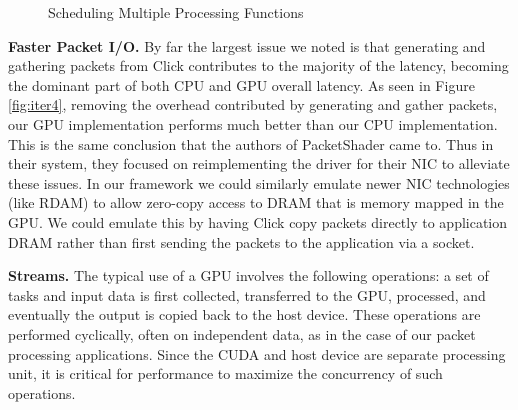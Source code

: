 \begin{figure}
    \centering

	\medskip

    \caption{Scheduling Multiple Processing Functions}
	\label{fig:scheduling}
\end{figure}

\medskip \noindent \textbf{Faster Packet I/O.} By far the largest issue we noted
is that generating and gathering packets from Click contributes to the majority
of the latency, becoming the dominant part of both CPU and GPU overall
latency. As seen in Figure \ref{fig:iter4}, removing the overhead contributed by
generating and gather packets, our GPU implementation performs much better than
our CPU implementation. This is the same conclusion that the authors of
PacketShader \cite{Han} came to. Thus in their system, they focused on
reimplementing the driver for their NIC to alleviate these issues. In our
framework we could similarly emulate newer NIC technologies (like RDAM) to allow
zero-copy access to DRAM that is memory mapped in the GPU. We could emulate this
by having Click copy packets directly to application DRAM rather than first
sending the packets to the application via a socket.

\medskip \noindent \textbf{Streams.} The typical use of a GPU involves the
following operations: a set of tasks and input data is first collected,
transferred to the GPU, processed, and eventually the output is copied back to
the host device. These operations are performed cyclically, often on
independent data, as in the case of our packet processing applications. Since
the CUDA and host device are separate processing unit, it is critical for
performance to maximize the concurrency of such operations.

